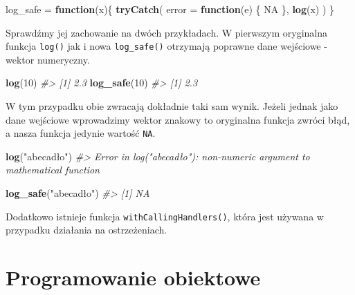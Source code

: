 \documentclass[paper=6in:9in,pagesize=pdftex,headinclude=on,footinclude=on,10pt]{scrbook}
\newenvironment{Shaded}{\begin{snugshade}}{\end{snugshade}}
\newcommand{\CommentTok}[1]{\textcolor[rgb]{0.56,0.35,0.01}{\textit{#1}}}
\newcommand{\ControlFlowTok}[1]{\textcolor[rgb]{0.13,0.29,0.53}{\textbf{#1}}}
\newcommand{\DataTypeTok}[1]{\textcolor[rgb]{0.13,0.29,0.53}{#1}}
\newcommand{\DecValTok}[1]{\textcolor[rgb]{0.00,0.00,0.81}{#1}}
\newcommand{\KeywordTok}[1]{\textcolor[rgb]{0.13,0.29,0.53}{\textbf{#1}}}
\newcommand{\NormalTok}[1]{#1}
\newcommand{\OtherTok}[1]{\textcolor[rgb]{0.56,0.35,0.01}{#1}}
\newcommand{\StringTok}[1]{\textcolor[rgb]{0.31,0.60,0.02}{#1}}
\let\BeginKnitrBlock\begin \let\EndKnitrBlock\end
\begin{document}
\begin{Shaded}
\begin{Highlighting}[]
\NormalTok{log_safe =}\StringTok{ }\ControlFlowTok{function}\NormalTok{(x)\{}
  \KeywordTok{tryCatch}\NormalTok{(}
  \DataTypeTok{error =} \ControlFlowTok{function}\NormalTok{(e) \{}
    \OtherTok{NA}
\NormalTok{  \},}
  \KeywordTok{log}\NormalTok{(x)}
\NormalTok{  )}
\NormalTok{\}}
\end{Highlighting}
\end{Shaded}

Sprawdźmy jej zachowanie na dwóch przykładach.
W pierwszym oryginalna funkcja \texttt{log()} jak i nowa \texttt{log\_safe()} otrzymają poprawne dane wejściowe - wektor numeryczny.

\begin{Shaded}
\begin{Highlighting}[]
\KeywordTok{log}\NormalTok{(}\DecValTok{10}\NormalTok{)}
\CommentTok{#> [1] 2.3}
\KeywordTok{log_safe}\NormalTok{(}\DecValTok{10}\NormalTok{)}
\CommentTok{#> [1] 2.3}
\end{Highlighting}
\end{Shaded}

W tym przypadku obie zwracają dokładnie taki sam wynik.
Jeżeli jednak jako dane wejściowe wprowadzimy wektor znakowy to oryginalna funkcja zwróci błąd, a nasza funkcja jedynie wartość \texttt{NA}.

\begin{Shaded}
\begin{Highlighting}[]
\KeywordTok{log}\NormalTok{(}\StringTok{"abecadło"}\NormalTok{)}
\CommentTok{#> Error in log("abecadło"): non-numeric argument to mathematical function}
\end{Highlighting}
\end{Shaded}

\begin{Shaded}
\begin{Highlighting}[]
\KeywordTok{log_safe}\NormalTok{(}\StringTok{"abecadło"}\NormalTok{)}
\CommentTok{#> [1] NA}
\end{Highlighting}
\end{Shaded}

\BeginKnitrBlock{rmdinfo}
Dodatkowo istnieje funkcja \texttt{withCallingHandlers()}, która jest używana w przypadku działania na ostrzeżeniach.
\EndKnitrBlock{rmdinfo}

\hypertarget{oop}{%
\section{Programowanie obiektowe}\label{oop}}
\end{document}

